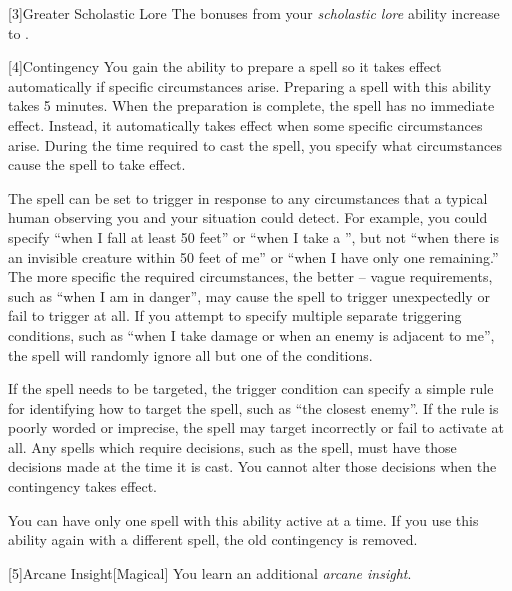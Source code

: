         [3]{Greater Scholastic Lore} The bonuses from your \textit{scholastic lore} ability increase to .

        [4]{Contingency} You gain the ability to prepare a spell so it takes effect automatically if specific circumstances arise.
        Preparing a spell with this ability takes 5 minutes.
        When the preparation is complete, the spell has no immediate effect.
        Instead, it automatically takes effect when some specific circumstances arise.
        During the time required to cast the spell, you specify what circumstances cause the spell to take effect.

        The spell can be set to trigger in response to any circumstances that a typical human observing you and your situation could detect.
        For example, you could specify ``when I fall at least 50 feet'' or ``when I take a '', but not ``when there is an invisible creature within 50 feet of me'' or ``when I have only one  remaining.''
        The more specific the required circumstances, the better -- vague requirements, such as ``when I am in danger'', may cause the spell to trigger unexpectedly or fail to trigger at all.
        If you attempt to specify multiple separate triggering conditions, such as ``when I take damage or when an enemy is adjacent to me'', the spell will randomly ignore all but one of the conditions.

        If the spell needs to be targeted, the trigger condition can specify a simple rule for identifying how to target the spell, such as ``the closest enemy''.
        If the rule is poorly worded or imprecise, the spell may target incorrectly or fail to activate at all.
        Any spells which require decisions, such as the  spell, must have those decisions made at the time it is cast.
        You cannot alter those decisions when the contingency takes effect.

        You can have only one spell with this ability active at a time.
        If you use this ability again with a different spell, the old contingency is removed.

        [5]{Arcane Insight}[Magical]
        You learn an additional \textit{arcane insight}.

